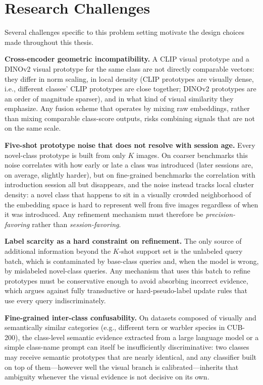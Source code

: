 \documentclass{iutbscthesis}
\begin{document}
\section{Research Challenges}

Several challenges specific to this problem setting motivate the design choices made throughout this thesis.

\textbf{Cross-encoder geometric incompatibility.} A CLIP visual prototype and a DINOv2 visual prototype for the same class are not directly comparable vectors: they differ in norm scaling, in local density (CLIP prototypes are visually dense, i.e., different classes' CLIP prototypes are close together; DINOv2 prototypes are an order of magnitude sparser), and in what kind of visual similarity they emphasize. Any fusion scheme that operates by mixing raw embeddings, rather than mixing comparable class-score outputs, risks combining signals that are not on the same scale.

\textbf{Five-shot prototype noise that does not resolve with session age.} Every novel-class prototype is built from only $K$ images. On coarser benchmarks this noise correlates with how early or late a class was introduced (later sessions are, on average, slightly harder), but on fine-grained benchmarks the correlation with introduction session all but disappears, and the noise instead tracks local cluster density: a novel class that happens to sit in a visually crowded neighborhood of the embedding space is hard to represent well from five images regardless of when it was introduced. Any refinement mechanism must therefore be \emph{precision-favoring} rather than \emph{session-favoring}.

\textbf{Label scarcity as a hard constraint on refinement.} The only source of additional information beyond the $K$-shot support set is the unlabeled query batch, which is contaminated by base-class queries and, when the model is wrong, by mislabeled novel-class queries. Any mechanism that uses this batch to refine prototypes must be conservative enough to avoid absorbing incorrect evidence, which argues against fully transductive or hard-pseudo-label update rules that use every query indiscriminately.

\textbf{Fine-grained inter-class confusability.} On datasets composed of visually and semantically similar categories (e.g., different tern or warbler species in CUB-200), the class-level semantic evidence extracted from a large language model or a simple class-name prompt can itself be insufficiently discriminative: two classes may receive semantic prototypes that are nearly identical, and any classifier built on top of them---however well the visual branch is calibrated---inherits that ambiguity whenever the visual evidence is not decisive on its own.
\end{document}
